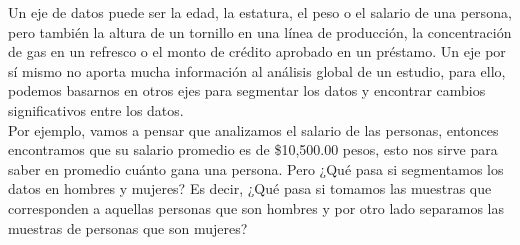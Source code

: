 \documentclass{article}
\begin{document}
Un eje de datos puede ser la edad, la estatura, el peso o el salario de una persona, pero también la altura de un tornillo en una línea de producción, la concentración de gas en un refresco o el monto de crédito aprobado en un préstamo. Un eje por sí mismo no aporta mucha información al análisis global de un estudio, para ello, podemos basarnos en otros ejes para segmentar los datos y encontrar cambios significativos entre los datos.
\\[12pt]
Por ejemplo, vamos a pensar que analizamos el salario de las personas, entonces encontramos que su salario promedio es de \$10,500.00 pesos, esto nos sirve para saber en promedio cuánto gana una persona. Pero ¿Qué pasa si segmentamos los datos en hombres y mujeres? Es decir, ¿Qué pasa si tomamos las muestras que corresponden a aquellas personas que son hombres y por otro lado separamos las muestras de personas que son mujeres?
\end{document}
